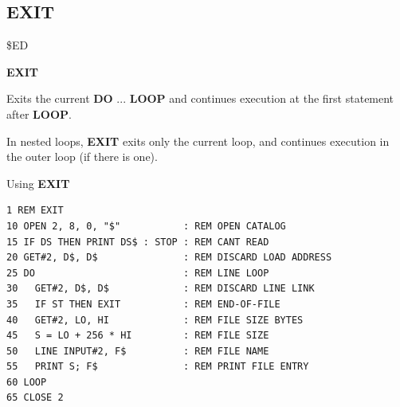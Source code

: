 \subsection{EXIT}
\begin{description}[leftmargin=2cm,style=nextline]
\item [Token:]    \$ED

\item [Format:]   {\bf EXIT}

\item [Usage:]    Exits the current {\bf DO} ... {\bf LOOP} and continues execution at the first statement after {\bf LOOP}.

\item [Remarks:]  In nested loops, {\bf EXIT} exits only the current loop, and continues execution in the outer loop (if there is one).

\item [Example:]  Using {\bf EXIT}

\begin{tcolorbox}[colback=black,coltext=white]
\verbatimfont{\codefont}
\begin{verbatim}
1 REM EXIT
10 OPEN 2, 8, 0, "$"           : REM OPEN CATALOG
15 IF DS THEN PRINT DS$ : STOP : REM CANT READ
20 GET#2, D$, D$               : REM DISCARD LOAD ADDRESS
25 DO                          : REM LINE LOOP
30   GET#2, D$, D$             : REM DISCARD LINE LINK
35   IF ST THEN EXIT           : REM END-OF-FILE
40   GET#2, LO, HI             : REM FILE SIZE BYTES
45   S = LO + 256 * HI         : REM FILE SIZE
50   LINE INPUT#2, F$          : REM FILE NAME
55   PRINT S; F$               : REM PRINT FILE ENTRY
60 LOOP
65 CLOSE 2
\end{verbatim}
\end{tcolorbox}
\end{description}


\newpage
